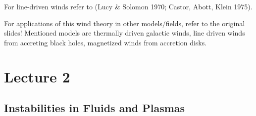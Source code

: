 \documentclass[letterpaper, 11pt]{article}
\numberwithin{equation}{section}
\numberwithin{figure}{section}
\begin{document}
For line-driven winds refer to (Lucy \& Solomon 1970; Castor, Abott, Klein 1975).

For applications of this wind theory in other models/fields, refer to the
original slides! Mentioned models are thermally driven galactic winds, line
driven winds from accreting black holes, magnetized winds from accretion disks.

\section{Lecture 2}

\subsection{Instabilities in Fluids and Plasmas}
\end{document}
